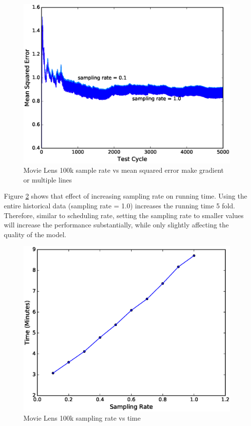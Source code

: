 \documentclass{sig-alternate-05-2015}
\begin{document}
\begin{figure}[H]
\centering
\includegraphics[width=\columnwidth]{../images/experiment-results/movie-lens-100k-sampling-rate.eps}
\caption{Movie Lens 100k sample rate vs mean squared error{\color{red} make gradient or multiple lines}}
\label{fig:movie-lens-100k-sample-rate}
\end{figure}

Figure \ref{fig:movie-lens-100k-sample-rate-time} shows that effect of increasing sampling rate on running time.
Using the entire historical data (sampling rate = 1.0) increases the running time 5 fold. 
Therefore, similar to scheduling rate, setting the sampling rate to smaller values will increase the performance substantially, while only slightly affecting the quality of the model.


\begin{figure}[H]
\centering
\includegraphics[width=\columnwidth]{../images/experiment-results/movie-lens-100k-sampling-time.eps}
\caption{Movie Lens 100k sampling rate vs time}
\label{fig:movie-lens-100k-sample-rate-time}
\end{figure}
\end{document}
